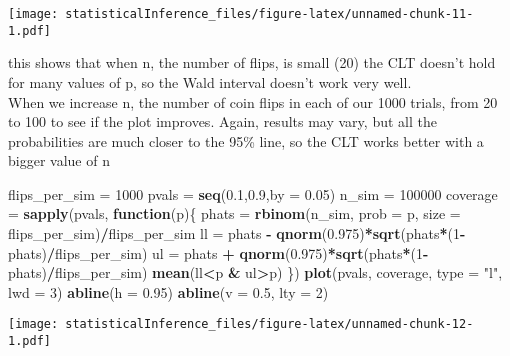 \documentclass[
]{article}
\newenvironment{Shaded}{\begin{snugshade}}{\end{snugshade}}
\newcommand{\ControlFlowTok}[1]{\textcolor[rgb]{0.13,0.29,0.53}{\textbf{#1}}}
\newcommand{\DataTypeTok}[1]{\textcolor[rgb]{0.13,0.29,0.53}{#1}}
\newcommand{\DecValTok}[1]{\textcolor[rgb]{0.00,0.00,0.81}{#1}}
\newcommand{\FloatTok}[1]{\textcolor[rgb]{0.00,0.00,0.81}{#1}}
\newcommand{\KeywordTok}[1]{\textcolor[rgb]{0.13,0.29,0.53}{\textbf{#1}}}
\newcommand{\NormalTok}[1]{#1}
\newcommand{\OperatorTok}[1]{\textcolor[rgb]{0.81,0.36,0.00}{\textbf{#1}}}
\newcommand{\StringTok}[1]{\textcolor[rgb]{0.31,0.60,0.02}{#1}}
\begin{document}
\texttt{[image: statisticalInference\_files/figure-latex/unnamed-chunk-11-1.pdf]}

this shows that when n, the number of flips, is small (20) the CLT
doesn't hold for many values of p, so the Wald interval doesn't work
very well.\\
When we increase n, the number of coin flips in each of our 1000 trials,
from 20 to 100 to see if the plot improves. Again, results may vary, but
all the probabilities are much closer to the 95\% line, so the CLT works
better with a bigger value of n

\begin{Shaded}
\begin{Highlighting}[]
\NormalTok{flips_per_sim =}\StringTok{ }\DecValTok{1000}
\NormalTok{pvals =}\StringTok{ }\KeywordTok{seq}\NormalTok{(}\FloatTok{0.1}\NormalTok{,}\FloatTok{0.9}\NormalTok{,}\DataTypeTok{by =} \FloatTok{0.05}\NormalTok{)}
\NormalTok{n_sim =}\StringTok{ }\DecValTok{100000}
\NormalTok{coverage =}\StringTok{ }\KeywordTok{sapply}\NormalTok{(pvals, }\ControlFlowTok{function}\NormalTok{(p)\{}
\NormalTok{  phats =}\StringTok{ }\KeywordTok{rbinom}\NormalTok{(n_sim, }\DataTypeTok{prob =}\NormalTok{ p, }\DataTypeTok{size =}\NormalTok{ flips_per_sim)}\OperatorTok{/}\NormalTok{flips_per_sim}
\NormalTok{  ll =}\StringTok{ }\NormalTok{phats }\OperatorTok{-}\StringTok{ }\KeywordTok{qnorm}\NormalTok{(}\FloatTok{0.975}\NormalTok{)}\OperatorTok{*}\KeywordTok{sqrt}\NormalTok{(phats}\OperatorTok{*}\NormalTok{(}\DecValTok{1}\OperatorTok{-}\NormalTok{phats)}\OperatorTok{/}\NormalTok{flips_per_sim)}
\NormalTok{  ul =}\StringTok{ }\NormalTok{phats }\OperatorTok{+}\StringTok{ }\KeywordTok{qnorm}\NormalTok{(}\FloatTok{0.975}\NormalTok{)}\OperatorTok{*}\KeywordTok{sqrt}\NormalTok{(phats}\OperatorTok{*}\NormalTok{(}\DecValTok{1}\OperatorTok{-}\NormalTok{phats)}\OperatorTok{/}\NormalTok{flips_per_sim)}
  \KeywordTok{mean}\NormalTok{(ll}\OperatorTok{<}\NormalTok{p }\OperatorTok{&}\StringTok{ }\NormalTok{ul}\OperatorTok{>}\NormalTok{p)}
\NormalTok{\})}
\KeywordTok{plot}\NormalTok{(pvals, coverage, }\DataTypeTok{type =} \StringTok{"l"}\NormalTok{, }\DataTypeTok{lwd =} \DecValTok{3}\NormalTok{)}
\KeywordTok{abline}\NormalTok{(}\DataTypeTok{h =} \FloatTok{0.95}\NormalTok{)}
\KeywordTok{abline}\NormalTok{(}\DataTypeTok{v =} \FloatTok{0.5}\NormalTok{, }\DataTypeTok{lty =} \DecValTok{2}\NormalTok{)}
\end{Highlighting}
\end{Shaded}

\texttt{[image: statisticalInference\_files/figure-latex/unnamed-chunk-12-1.pdf]}
\end{document}
